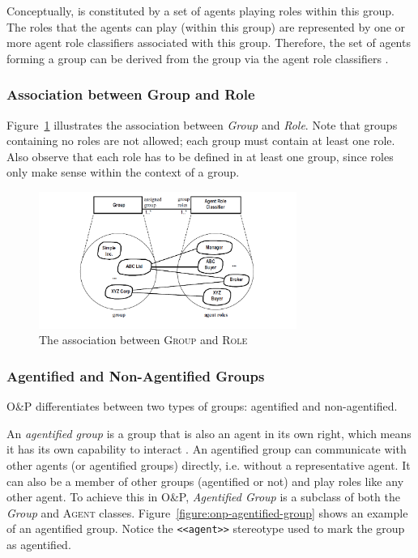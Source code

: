 Conceptually, is constituted by a set of agents playing roles within this group.
The roles that the agents can play (within this group) are represented by one or more agent role classifiers associated with this group.
Therefore, the set of agents forming a group can be derived from the group via the agent role classifiers \cite{Odell05}.

\subsubsection*{Association between Group and Role}

Figure~\ref{figure:onp-group-role-association} illustrates the association between \textit{Group} and \textit{Role}.
Note that groups containing no roles are not allowed; each group must contain at least one role.
Also observe that each role has to be defined in at least one group, since roles only make sense within the context of a group.

\begin{figure}[ht]
	\centering
	\includegraphics[width=0.75\textwidth]{images/onp/group-role-association.png}
	\caption{The association between \textsc{Group} and \textsc{Role}}
	\label{figure:onp-group-role-association}
\end{figure}

\subsubsection*{Agentified and Non-Agentified Groups}

O\&P differentiates between two types of groups: agentified and non-agentified.

An \textit{agentified group} is a group that is also an agent in its own right, which means it has its own capability to interact \cite{Odell05}.
An agentified group can communicate with other agents (or agentified groups) directly, i.e. without a representative agent.
It can also be a member of other groups (agentified or not) and play roles like any other agent.
To achieve this in O\&P, \textit{Agentified Group} is a subclass of both the \textit{Group} and \textsc{Agent} classes.
Figure~\ref{figure:onp-agentified-group} shows an example of an agentified group.
Notice the \texttt{<<agent>>} stereotype used to mark the group as agentified.

